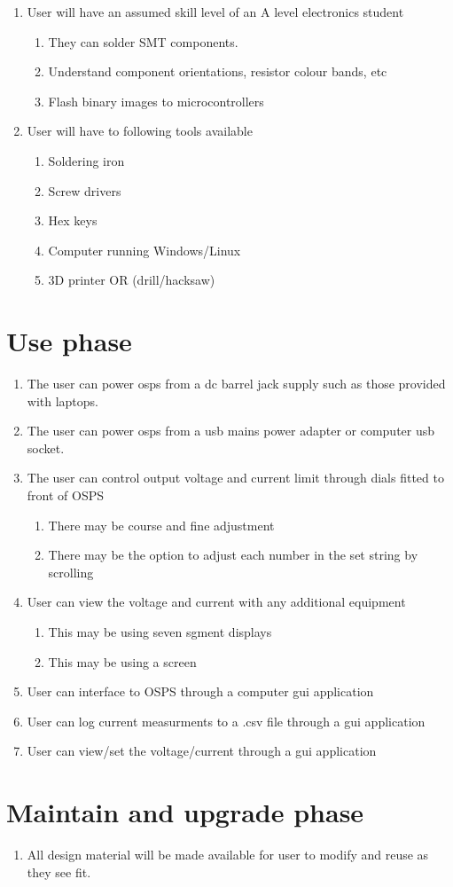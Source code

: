 \documentclass[12pt,a4paper]{article}
\begin{document}
\begin{enumerate}[label*=\arabic*.]
\begin{enumerate}[label*=\arabic*.]
	\end{enumerate}
\item User will have an assumed skill level of an A level electronics student
		\begin{enumerate}[label*=\arabic*.]
		\item They can solder SMT components. 
		\item Understand component orientations, resistor colour bands, etc
		\item Flash binary images to microcontrollers
		\end{enumerate}
\item User will have to following tools available
		\begin{enumerate}[label*=\arabic*.]
		\item Soldering iron
		\item Screw drivers
		\item Hex keys
		\item Computer running Windows/Linux
		\item3D printer OR (drill/hacksaw) 
		\end{enumerate}
\end{enumerate}


\section{Use phase}
\begin{enumerate}
\item The user can power \gls{osps} from a \gls{dc} barrel jack supply such as those provided with laptops.
\item The user can power \gls{osps} from a \gls{usb} mains power adapter  or computer \gls{usb} socket.
\item The user can control output voltage and current limit through dials fitted to front of OSPS
	\begin{enumerate}[label*=\arabic*.]
	\item There may be  course and fine adjustment 
	\item There may be the option to adjust each number in the set string by scrolling 
	\end{enumerate}
\item User can view the voltage and current with any additional equipment
	\begin{enumerate}[label*=\arabic*.]
	\item This may be using seven sgment displays
	\item This may be using a screen
	\end{enumerate}
\item User can interface to OSPS through a computer \gls{gui} application
\item User can log current measurments to a .csv file through a \gls{gui} application
\item User can view/set the voltage/current through a \gls{gui} application
\end{enumerate}


\section{Maintain and upgrade phase}
\begin{enumerate}
\item All design material will be made available for user to modify and reuse as they see fit.
\end{enumerate}
\end{document}
